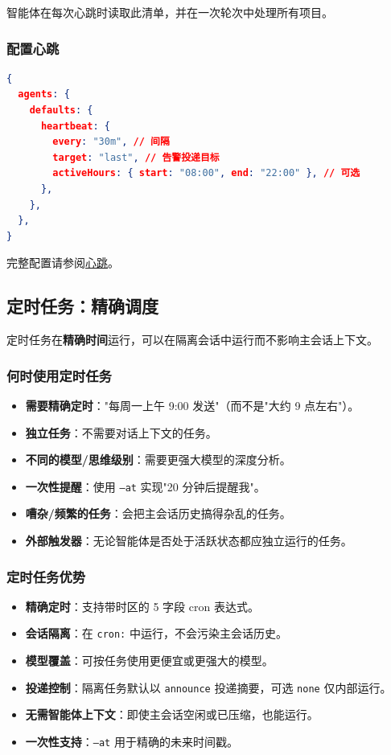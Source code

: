 智能体在每次心跳时读取此清单，并在一次轮次中处理所有项目。

\subsubsection{配置心跳}


\begin{lstlisting}[language=json]
{
  agents: {
    defaults: {
      heartbeat: {
        every: "30m", // 间隔
        target: "last", // 告警投递目标
        activeHours: { start: "08:00", end: "22:00" }, // 可选
      },
    },
  },
}
\end{lstlisting}


完整配置请参阅\href{/gateway/heartbeat}{心跳}。

\subsection{定时任务：精确调度}


定时任务在\textbf{精确时间}运行，可以在隔离会话中运行而不影响主会话上下文。

\subsubsection{何时使用定时任务}


\begin{itemize}
  \item \textbf{需要精确定时}："每周一上午 9:00 发送"（而不是"大约 9 点左右"）。
  \item \textbf{独立任务}：不需要对话上下文的任务。
  \item \textbf{不同的模型/思维级别}：需要更强大模型的深度分析。
  \item \textbf{一次性提醒}：使用 \texttt{--at} 实现"20 分钟后提醒我"。
  \item \textbf{嘈杂/频繁的任务}：会把主会话历史搞得杂乱的任务。
  \item \textbf{外部触发器}：无论智能体是否处于活跃状态都应独立运行的任务。
\end{itemize}


\subsubsection{定时任务优势}


\begin{itemize}
  \item \textbf{精确定时}：支持带时区的 5 字段 cron 表达式。
  \item \textbf{会话隔离}：在 \texttt{cron:} 中运行，不会污染主会话历史。
  \item \textbf{模型覆盖}：可按任务使用更便宜或更强大的模型。
  \item \textbf{投递控制}：隔离任务默认以 \texttt{announce} 投递摘要，可选 \texttt{none} 仅内部运行。
  \item \textbf{无需智能体上下文}：即使主会话空闲或已压缩，也能运行。
  \item \textbf{一次性支持}：\texttt{--at} 用于精确的未来时间戳。
\end{itemize}


